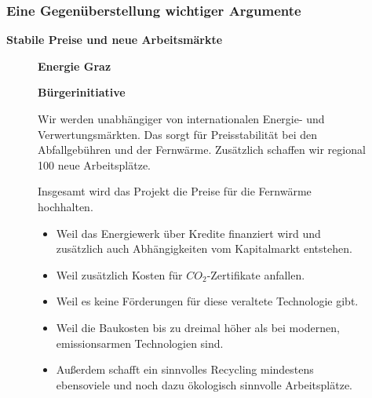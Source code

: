 \documentclass[8pt]{beamer}
\begin{document}
	
		\begin{frame}[t]
		\frametitle{Eine Gegenüberstellung wichtiger Argumente} 
		\textbf{Stabile Preise und neue Arbeitsmärkte}
		\begin{figure}[htbp]
			\begin{minipage}[t]{0.38\textwidth}
				\textbf{Energie Graz}
			\end{minipage}
			\hfill
			\begin{minipage}[t]{0.58\textwidth}
				\textbf{Bürgerinitiative}
			\end{minipage}
		\end{figure}
		\begin{figure}[htbp]
			\begin{minipage}[t]{0.38\textwidth}
				\begin{framed}				
					 Wir werden unabhängiger von internationalen Energie- und Verwertungsmärkten. Das sorgt für Preisstabilität bei den Abfallgebühren und der Fernwärme. Zusätzlich schaffen wir regional 100 neue Arbeitsplätze.
				\end{framed}
			\end{minipage}
			\hfill
			\begin{minipage}[t]{0.58\textwidth}
				\begin{framed}
				Insgesamt wird das Projekt die Preise für die Fernwärme hochhalten.
                \begin{itemize}
                  \item Weil das Energiewerk über Kredite finanziert wird und zusätzlich auch  Abhängigkeiten vom Kapitalmarkt entstehen.
                  \item Weil zusätzlich Kosten für $CO_2$-Zertifikate anfallen.
                  \item Weil es keine Förderungen für diese veraltete Technologie gibt. 
                  \item Weil die Baukosten bis zu dreimal höher als bei modernen, emissionsarmen Technologien sind.
                  \item Außerdem schafft ein sinnvolles Recycling mindestens ebensoviele und noch dazu ökologisch sinnvolle Arbeitsplätze.
                 \end{itemize}
				\end{framed}
			\end{minipage}
		\end{figure}
	\end{frame}		
	
\end{document}
